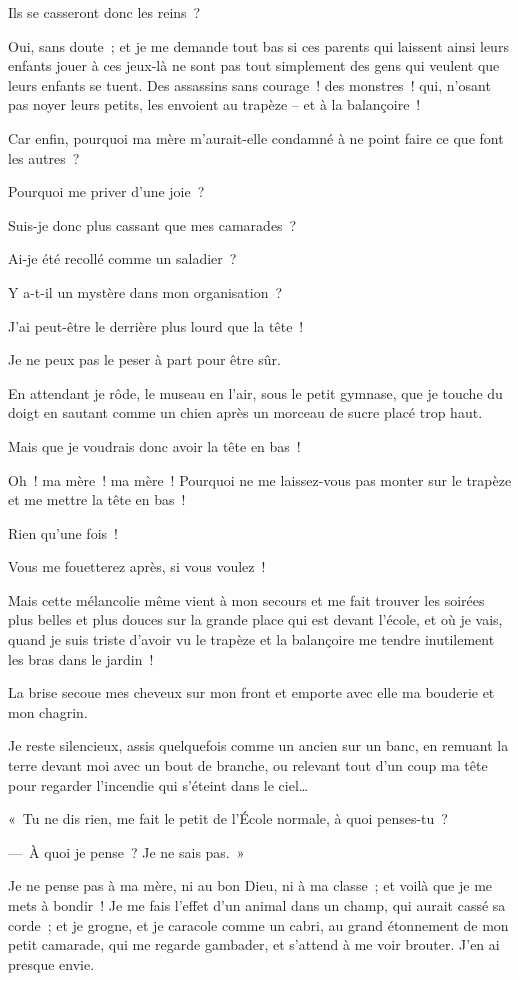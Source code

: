 \documentclass[french,twoside]{book} %
\begin{document}
Ils se casseront donc les reins ?\par
Oui, sans doute ; et je me demande tout bas si ces parents qui laissent ainsi leurs enfants jouer à ces jeux-là ne sont pas tout simplement des gens qui veulent que leurs enfants se tuent. Des assassins sans courage ! des monstres ! qui, n’osant pas noyer leurs petits, les envoient au trapèze – et à la balançoire !\par
Car enfin, pourquoi ma mère m’aurait-elle condamné à ne point faire ce que font les autres ?\par
Pourquoi me priver d’une joie ?\par
Suis-je donc plus cassant que mes camarades ?\par
Ai-je été recollé comme un saladier ?\par
Y a-t-il un mystère dans mon organisation ?\par
J’ai peut-être le derrière plus lourd que la tête !\par
Je ne peux pas le peser à part pour être sûr.\par
En attendant je rôde, le museau en l’air, sous le petit gymnase, que je touche du doigt en sautant comme un chien après un morceau de sucre placé trop haut.\par
Mais que je voudrais donc avoir la tête en bas !\par
Oh ! ma mère ! ma mère ! Pourquoi ne me laissez-vous pas monter sur le trapèze et me mettre la tête en bas !\par
Rien qu’une fois !\par
Vous me fouetterez après, si vous voulez !\par
\bigbreak
\noindent Mais cette mélancolie même vient à mon secours et me fait trouver les soirées plus belles et plus douces sur la grande place qui est devant l’école, et où je vais, quand je suis triste d’avoir vu le trapèze et la balançoire me tendre inutilement les bras dans le jardin !\par
La brise secoue mes cheveux sur mon front et emporte avec elle ma bouderie et mon chagrin.\par
Je reste silencieux, assis quelquefois comme un ancien sur un banc, en remuant la terre devant moi avec un bout de branche, ou relevant tout d’un coup ma tête pour regarder l’incendie qui s’éteint dans le ciel…\par
« Tu ne dis rien, me fait le petit de l’École normale, à quoi penses-tu ?\par
— À quoi je pense ? Je ne sais pas. »\par
Je ne pense pas à ma mère, ni au bon Dieu, ni à ma classe ; et voilà que je me mets à bondir ! Je me fais l’effet d’un animal dans un champ, qui aurait cassé sa corde ; et je grogne, et je caracole comme un cabri, au grand étonnement de mon petit camarade, qui me regarde gambader, et s’attend à me voir brouter. J’en ai presque envie.
\end{document}
